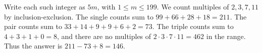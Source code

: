 Write each such integer as $5m$, with $1\le m\le199$. We count multiples of $2,3,7,11$ by inclusion-exclusion. The single counts sum to $99+66+28+18=211$. The pair counts sum to $33+14+9+9+6+2=73$. The triple counts sum to $4+3+1+0=8$, and there are no multiples of $2\cdot3\cdot7\cdot11=462$ in the range. Thus the answer is $211-73+8=\boxed{146}$.
